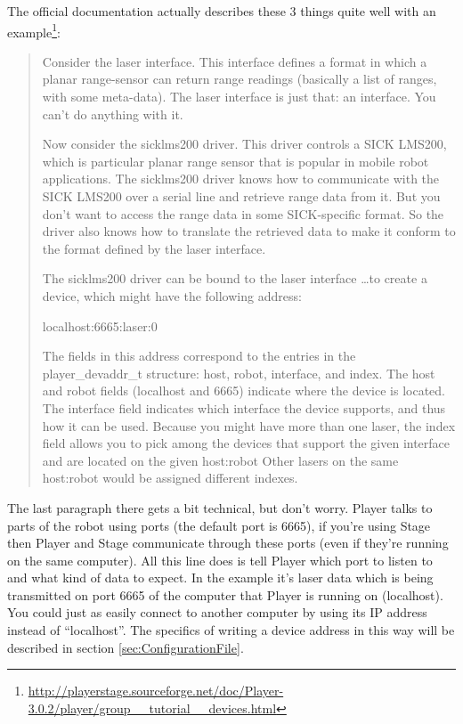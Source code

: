 \documentclass[a4paper]{report}
\newcommand{\pl}{Player\xspace}
\begin{document}
The official documentation actually describes these 3 things quite well with an example\footnote{\url{http://playerstage.sourceforge.net/doc/Player-3.0.2/player/group__tutorial__devices.html}}:

\begin{quotation}
Consider the laser interface. This interface defines a format in which a planar range-sensor can return range readings (basically a list of ranges, with some meta-data). The laser interface is just that: an interface. You can't do anything with it.

Now consider the sicklms200 driver. This driver controls a SICK LMS200, which is particular planar range sensor that is popular in mobile robot applications. The sicklms200 driver knows how to communicate with the SICK LMS200 over a serial line and retrieve range data from it. But you don't want to access the range data in some SICK-specific format. So the driver also knows how to translate the retrieved data to make it conform to the format defined by the laser interface.

	The sicklms200 driver can be bound to the laser interface \ldots to create a device, which might have the following address:

	localhost:6665:laser:0 
	
The fields in this address correspond to the entries in the \mbox{player\_devaddr\_t} structure: host, robot, interface, and index. The host and robot fields (localhost and 6665) indicate where the device is located. The interface field indicates which interface the device supports, and thus how it can be used. 
Because you might have more than one laser, the index field allows you to pick among the devices that support the given interface and are located on the given host:robot Other lasers on the same host:robot would be assigned different indexes.
\end{quotation}

The last paragraph there gets a bit technical, but don't worry. \pl talks to parts of the robot using ports (the default port is 6665), if you're using Stage then \pl and Stage communicate through these ports (even if they're running on the same computer). 
All this line does is tell \pl which port to listen to and what kind of data to expect. In the example it's laser data which is being transmitted on port 6665 of the computer that \pl is running on (localhost). 
You could just as easily connect to another computer by using its IP address instead of ``localhost''. The specifics of writing a device address in this way will be described in section \ref{sec:ConfigurationFile}.
\end{document}
